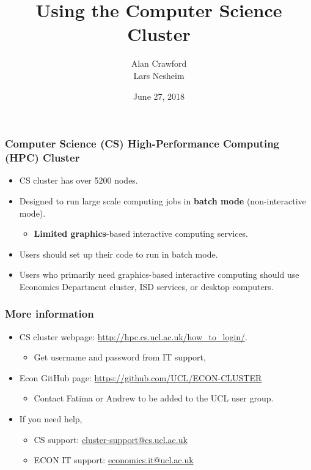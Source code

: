 \documentclass{beamer}
\title{Using the Computer Science Cluster}
\author{Alan Crawford \\
           Lars Nesheim}
\date{June 27, 2018}
\begin{document}
\frame{\titlepage}


\begin{frame}
\frametitle{Computer Science (CS) High-Performance Computing (HPC) Cluster}

\begin{itemize}
\item CS cluster has over 5200 nodes.
\item Designed to run large scale computing jobs in \textbf{batch mode} (non-interactive mode).
\begin{itemize}
\item \textbf{Limited graphics}-based interactive computing services. 
\end{itemize}
\item Users should set up their code to run in batch mode.
\item Users who primarily need graphics-based interactive computing should use Economics Department cluster, ISD services, or desktop computers. 
\end{itemize}
\end{frame}

\begin{frame}
\frametitle{More information}
\begin{itemize}
\item CS cluster webpage: \textcolor{blue}{\url{http://hpc.cs.ucl.ac.uk/how_to_login/}}.
\begin{itemize}
\item Get username and password from IT support,
\end{itemize}
\item Econ GitHub page: \textcolor{blue}{\url{https://github.com/UCL/ECON-CLUSTER}}
\begin{itemize}
\item Contact Fatima or Andrew to be added to the UCL user group.
\end{itemize}
\item If you need help, 
\begin{itemize}
\item CS support: \textcolor{blue}{\url{cluster-support@cs.ucl.ac.uk}}
\item ECON IT support:  \textcolor{blue}{\url{economics.it@ucl.ac.uk}}
\end{itemize}
\end{itemize}
\end{frame}
\end{document}
